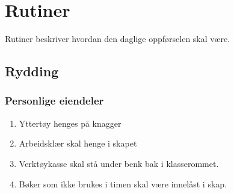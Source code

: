 
\section{Rutiner}

Rutiner beskriver hvordan den daglige oppførselen skal være. 

\subsection{Rydding}

\subsubsection{Personlige eiendeler}
\begin{enumerate}
\item Yttertøy henges på knagger
\item Arbeidsklær skal henge i skapet 
\item Verktøykasse skal stå under benk bak i klasserommet.
\item Bøker som ikke brukes i timen skal være innelåst i skap. 
\end{enumerate}

\vfil \eject
